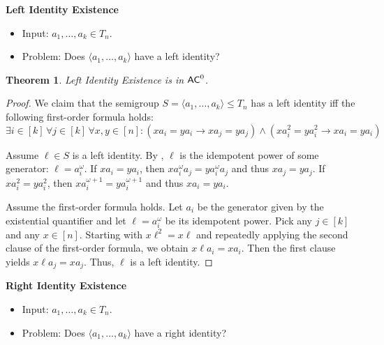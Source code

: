 \documentclass{amsart}
\newcommand{\AC}{\ensuremath\mathsf{AC}}
\newtheorem{theorem}{Theorem}[section]
\theoremstyle{remark}
\numberwithin{equation}{section}
\begin{document}
\medskip
{\bf Left Identity Existence}
\begin{itemize}
\item Input: $a_1,\dots,a_k \in T_n$.
\item Problem: Does $\langle a_1,\dots,a_k\rangle$ have a left identity?
\end{itemize}

\begin{theorem} \label{thm:leftid}
Left Identity Existence is in $\AC^0$.
\end{theorem}
\begin{proof}
We claim that the semigroup $S = \langle a_1,\dots,a_k \rangle \leq T_n$ has a left identity iff the following first-order formula holds:
\[ \exists i \in [k] \, \forall j \in [k] \, \forall x,y \in [n]: (x a_i = y a_i \rightarrow x a_j = y a_j) \wedge (x a_i^2 = y a_i^2 \rightarrow x a_i = y a_i) \]

Assume $\ell \in S$ is a left identity. By \cite[Lemma 6.1]{FJ:CP}, $\ell$ is the idempotent power of some generator: $\ell = a_i^\omega$. If $x a_i = y a_i$, then $x a_i^\omega a_j = y a_i^\omega a_j$ and thus $x a_j = y a_j$. If $x a_i^2 = y a_i^2$, then $x a_i^{\omega+1} = y a_i^{\omega+1}$ and thus $x a_i = y a_i$.

Assume the first-order formula holds. Let $a_i$ be the generator given by the existential quantifier and let $\ell = a_i^\omega$ be its idempotent power. Pick any $j \in [k]$ and any $x \in [n]$. Starting with $x\ell^2 = x\ell$ and repeatedly applying the second clause of the first-order formula, we obtain $x\ell a_i = x a_i$. Then the first clause yields $x\ell a_j = x a_j$. Thus, $\ell$ is a left identity.
\end{proof}

\medskip
{\bf Right Identity Existence}
\begin{itemize}
\item Input: $a_1,\dots,a_k \in T_n$.
\item Problem: Does $\langle a_1,\dots,a_k\rangle$ have a right identity?
\end{itemize}
\end{document}
